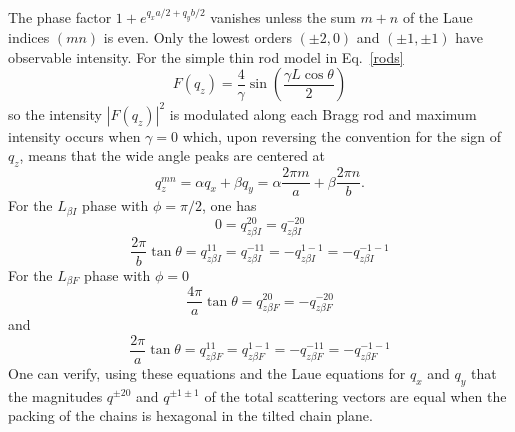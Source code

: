 The phase factor $1+e^{q_xa/2+q_yb/2}$ vanishes unless the sum $m+n$ of the 
Laue indices $(mn)$ is even. Only the lowest orders $(\pm2,0)$ and $(\pm1,\pm1)$ 
have observable intensity.  For the simple thin rod model in Eq.~\ref{rods} 
\begin{equation}\label{int}
  F(q_z) = \frac{4}{\gamma}\sin\left(\frac{\gamma L\cos{\theta}}{2}\right)
\end{equation}
so the intensity $|F(q_z)|^2$ is modulated along each Bragg rod and maximum 
intensity occurs when $\gamma=0$ which, upon reversing the convention for the 
sign of $q_z$, means that the wide angle peaks are centered at
\begin{equation}\label{centers}
  q_z^{mn}={\alpha}q_x+{\beta}q_y=\alpha\frac{2\pi{m}}{a}+\beta\frac{2\pi{n}}{b}.
\end{equation}
For the $L_{{\beta}I}$ phase with ${\phi}={\pi}/2$, one has
\begin{equation}\label{20LbI}
  0=q_{z{\beta}I}^{20}=q_{z{\beta}I}^{-20}
\end{equation}
\begin{equation}\label{11LbI}
  \frac{2\pi}{b}\tan{\theta}=q_{z{\beta}I}^{11}=q_{z{\beta}I}^{-11}=-q_{z{\beta}I}^{1-1}=-q_{z{\beta}I}^{-1-1}
\end{equation}
For the $L_{{\beta}F}$ phase with ${\phi}=0$
\begin{equation}\label{20LbF}
  \frac{4\pi}{a}\tan{\theta}=q_{z{\beta}F}^{20}=-q_{z{\beta}F}^{-20}
\end{equation}
and
\begin{equation}\label{11LbF}
  \frac{2\pi}{a}\tan{\theta}=q_{z{\beta}F}^{11}=q_{z{\beta}F}^{1-1}=-q_{z{\beta}F}^{-11}=-q_{z{\beta}F}^{-1-1}
\end{equation}
One can verify, using these equations and the Laue equations for $q_x$ and $q_y$ 
that the magnitudes $q^{{\pm}20}$ and $q^{{\pm}1{\pm}1}$ of the total scattering 
vectors are equal when the packing of the chains is hexagonal in the tilted chain 
plane.  

